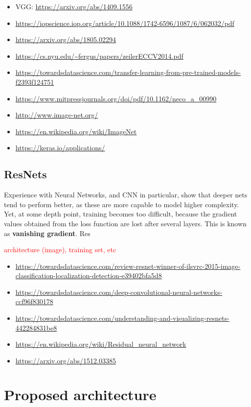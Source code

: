\begin{itemize}
	\item VGG: \url{https://arxiv.org/abs/1409.1556}
	\item \url{https://iopscience.iop.org/article/10.1088/1742-6596/1087/6/062032/pdf}
	\item \url{https://arxiv.org/abs/1805.02294}
	\item \url{https://cs.nyu.edu/~fergus/papers/zeilerECCV2014.pdf}
	\item \url{https://towardsdatascience.com/transfer-learning-from-pre-trained-models-f2393f124751}
	\item \url{https://www.mitpressjournals.org/doi/pdf/10.1162/neco_a_00990}
	\item \url{http://www.image-net.org/}
	\item \url{https://en.wikipedia.org/wiki/ImageNet}
	\item \url{https://keras.io/applications/}
\end{itemize}

\subsection{ResNets}

Experience with Neural Networks, and CNN in particular, show that deeper nets tend to perform better, as these are more capable to model higher complexity. Yet, at some depth point, training becomes too difficult, because the gradient values obtained from the loss function are lost after several layers. This is known as \textbf{vanishing gradient}. Res

\textcolor{red}{architecture (image), training set, etc}

\begin{itemize}
	\item \url{https://towardsdatascience.com/review-resnet-winner-of-ilsvrc-2015-image-classification-localization-detection-e39402bfa5d8}
	\item \url{https://towardsdatascience.com/deep-convolutional-neural-networks-ccf96f830178}
	\item \url{https://towardsdatascience.com/understanding-and-visualizing-resnets-442284831be8}
	\item \url{https://en.wikipedia.org/wiki/Residual_neural_network}
	\item \url{https://arxiv.org/abs/1512.03385}
\end{itemize}

\section{Proposed architecture}

